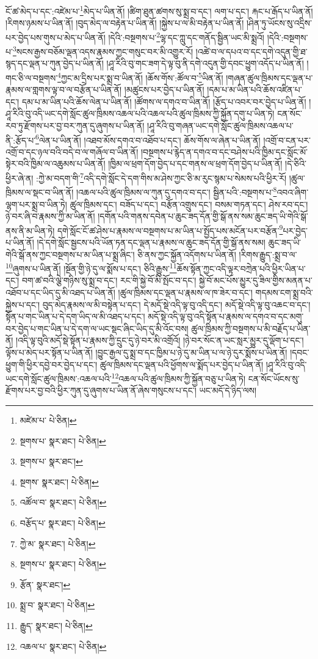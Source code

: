 ངོ་ཚ་མེད་པ་དང་:འཛེམ་པ་\footnote{མཛེམ་པ་  པེ་ཅིན། }མེད་པ་ཡིན་ནོ། །ཚིག་ཐུན་ཚགས་སུ་སྨྲ་བ་དང་། ལག་པ་དང་། རྐང་པ་རྒོད་པ་ཡིན་ནོ། །རིགས་ཉམས་པ་ཡིན་ནོ། །བུད་མེད་ལ་བརྟེན་པ་ཡིན་ནོ། །སྐྱེས་པ་ལ་མི་བརྟེན་པ་ཡིན་ནོ། །ཤིན་ཏུ་ཡོངས་སུ་འདྲིས་པར་བྱེད་པས་གུས་པ་མེད་པ་ཡིན་ནོ། །དེའི་:བསྔགས་པ་\footnote{སྔགས་པ་  སྣར་ཐང་།  པེ་ཅིན། }ལྷ་དང་ཀླུ་དང་གནོད་སྦྱིན་ཡང་མི་སྨྲའོ། །དེའི་:བསྔགས་པ་\footnote{སྔགས་པ་  སྣར་ཐང་། }སངས་རྒྱས་བཅོམ་ལྡན་འདས་རྣམས་ཀྱང་གསུང་བར་མི་འགྱུར་རོ། །འཚེ་བ་ལ་དཔའ་བ་དང་དགེ་འདུན་གྱི་ཐ་སྙད་དང་ལྡན་པ་ཀུན་བྱེད་པ་ཡིན་ནོ། །ཤཱ་རིའི་བུ་གང་ཟག་དེ་ལྟ་བུ་ནི་དགེ་འདུན་གྱི་དབང་ཕྱུག་འདོད་པ་ཡིན་ནོ། །གང་ཅི་ལ་བསྔགས་\footnote{སྔགས་  སྣར་ཐང་།  པེ་ཅིན། }ཀྱང་མ་དྲིས་པར་སྨྲ་བ་ཡིན་ནོ། །ཆོས་གོས་:ཚོལ་བ་\footnote{འཚོལ་བ་  སྣར་ཐང་།  པེ་ཅིན། }ཡིན་ནོ། །གཞན་ཚུལ་ཁྲིམས་དང་ལྡན་པ་རྣམས་ལ་གླགས་ལྟ་བ་ལ་བརྩོན་པ་ཡིན་ནོ། །མཚུངས་པར་བྱེད་པ་ཡིན་ནོ། །དམ་པ་མ་ཡིན་པའི་ཆོས་འཛིན་པ་དང་། དམ་པ་མ་ཡིན་པའི་ཆོས་ལེན་པ་ཡིན་ནོ། །ཚོགས་ལ་དགའ་བ་ཡིན་ནོ། །རྩོད་པ་འབར་བར་བྱེད་པ་ཡིན་ནོ། །ཤཱ་རིའི་བུ་འདི་ཡང་དགེ་སློང་ཚུལ་ཁྲིམས་འཆལ་པའི་འཆལ་པའི་ཚུལ་ཁྲིམས་ཀྱི་སྐྱོན་དགུ་པ་ཡིན་ཏེ། ངན་སོང་རབ་ཏུ་རྫོགས་པར་བྱ་བར་ཀུན་དུ་ཞུགས་པ་ཡིན་ནོ། །ཤཱ་རིའི་བུ་གཞན་ཡང་དགེ་སློང་ཚུལ་ཁྲིམས་འཆལ་པ་ནི་:རྩོད་པ་\footnote{བརྩོད་པ་  སྣར་ཐང་།  པེ་ཅིན། }ལེན་པ་ཡིན་ནོ། །འཐབ་མོས་དགའ་བ་འཐོབ་པ་དང་། ཆོས་གོས་ལ་ཞེན་པ་ཡིན་ནོ། །འགྲོ་བ་ངན་པར་འགྲོ་བ་དང་ཉལ་བའི་བདེ་བ་ལ་གཞོལ་བ་ཡིན་ནོ། །བསྔགས་པ་རྙེད་ན་དགའ་བ་དང་བཤེས་པའི་ཁྱིམ་དང་སློང་མོ་སྟེར་བའི་ཁྱིམ་ལ་འཆུམས་པ་ཡིན་ནོ། །ཁྱིམ་ལ་ཕྲག་དོག་བྱེད་པ་དང་གནས་ལ་ཕྲག་དོག་བྱེད་པ་ཡིན་ནོ། །དེ་ཅིའི་ཕྱིར་ཞེ་ན། :ཀྱེ་མ་བདག་གི་\footnote{ཀྱེ་མ་  སྣར་ཐང་།  པེ་ཅིན། }འདི་དགེ་སློང་དེ་དག་གིས་མ་ཤེས་ཀྱང་ཅི་མ་རུང་སྙམ་པ་སེམས་པའི་ཕྱིར་རོ། །ཚུལ་ཁྲིམས་ལ་སྡང་བ་ཡིན་ནོ། །འཆལ་པའི་ཚུལ་ཁྲིམས་ལ་ཀུན་དུ་དགའ་བ་དང་། སྦྱིན་པའི་:བསྔགས་པ་\footnote{སྔགས་པ་  སྣར་ཐང་།  པེ་ཅིན། }འབའ་ཞིག་ལྷག་པར་སྨྲ་བ་ཡིན་ཏེ། ཚུལ་ཁྲིམས་དང་། བཟོད་པ་དང་། བརྩོན་འགྲུས་དང་། བསམ་གཏན་དང་། ཤེས་རབ་དང་། ཉེ་བར་ཞི་བ་རྣམས་ཀྱི་མ་ཡིན་ནོ། །དགོན་པའི་གནས་དབེན་པ་ཆུང་ཟད་དོན་གྱི་སྒོ་ནས་སམ་ཆུང་ཟད་ཡི་གེའི་སྒོ་ནས་ནི་མ་ཡིན་ཏེ། དགེ་སློང་ངོ་ཚ་ཤེས་པ་རྣམས་ལ་བསྔགས་པ་མ་ཡིན་པ་སྤྱོད་པས་མངོན་པར་བརྩོན་\footnote{རྩོན་  སྣར་ཐང་། }པར་བྱེད་པ་ཡིན་ནོ། །དེ་དགེ་སློང་སྦྱངས་པའི་ཡོན་ཏན་དང་ལྡན་པ་རྣམས་ལ་ཆུང་ཟད་དོན་གྱི་སྒོ་ནས་སམ། ཆུང་ཟད་ཡི་གེའི་སྒོ་ནས་ཀྱང་བསྔགས་པ་མ་ཡིན་པ་སྨྲ་ཞིང་། ཅི་ནས་ཀྱང་སྐྱོན་འདོགས་པ་ཡིན་ནོ། །རིགས་རྒྱུད་:སྨྲ་བ་ལ་\footnote{སྨྲ་བ་  སྣར་ཐང་།  པེ་ཅིན། }ཞུགས་པ་ཡིན་ནོ། །སྔོན་གྱི་ཉེ་དུ་ལ་སྨོས་པ་དང་། ཅིའི་རྒྱུས་\footnote{རྒྱུད་  སྣར་ཐང་།  པེ་ཅིན། }ཆོས་སྟོན་ཀྱང་འདི་ལྟར་བཀྲེན་པའི་ཕྱིར་ཡིན་པ་དང་། བག་ཚ་བའི་ལྕེ་གཉིས་སུ་སྨྲ་བ་དང་། རང་གི་སྐྱེ་བོ་མི་སྤོང་བ་དང་། སྐྱེ་བོ་མང་པོས་མྱུར་དུ་ཟིལ་གྱིས་མནན་པ་འཐོབ་པ་དང་ཡིད་དུ་མི་འཐད་པ་ཡིན་ནོ། །ཚུལ་ཁྲིམས་དང་ལྡན་པ་རྣམས་ལ་ཁ་ཟེར་བ་དང་། གདམས་ངག་སྨྲ་བའི་སྐྱེས་པ་དང་། བུད་མེད་རྣམས་ལ་མི་བསྟེན་པ་དང་། དེ་མདོ་སྡེ་འདི་ལྟ་བུ་འདི་དང་། མདོ་སྡེ་འདི་ལྟ་བུ་འཆང་བ་དང་། སྟོན་པ་གང་ཡིན་པ་དེ་དག་ཡིད་ལ་མི་འཐད་པ་དང་། མདོ་སྡེ་འདི་ལྟ་བུ་འདི་སྟོན་པ་རྣམས་ལ་དགའ་བ་དང་མགུ་བར་བྱེད་པ་གང་ཡིན་པ་དེ་དག་ལ་ཡང་སྡང་ཞིང་ཡིད་དུ་མི་འོང་བས། ཚུལ་ཁྲིམས་ཀྱི་བསྔགས་པ་མི་བརྗོད་པ་ཡིན་ནོ། །འདི་ལྟ་བུའི་མདོ་སྡེ་སྟོན་པ་རྣམས་ཀྱི་དྲུང་དུ་ཉེ་བར་མི་འགྲོའོ། །ཉེ་བར་སོང་ན་ཡང་སླར་མྱུར་དུ་ལྡོག་པ་དང་། ལྟོས་པ་མེད་པར་སྟོན་པ་ཡིན་ནོ། །བྱུང་རྒྱལ་དུ་སྨྲ་བ་དང་ཁྱིམ་པ་ཉེ་དུ་མ་ཡིན་པ་ལ་ཉེ་དུར་སྨོས་པ་ཡིན་ནོ། །དབང་ཕྱུག་གི་ཕྱིར་དབྱེ་བར་བྱེད་པ་དང་། ཚུལ་ཁྲིམས་དང་ལྡན་པའི་ཕྱོགས་ལ་སྨོད་པར་བྱེད་པ་ཡིན་ནོ། །ཤཱ་རིའི་བུ་འདི་ཡང་དགེ་སློང་ཚུལ་ཁྲིམས་:འཆལ་པའི་\footnote{འཆལ་པ་  སྣར་ཐང་།  པེ་ཅིན། }འཆལ་པའི་ཚུལ་ཁྲིམས་ཀྱི་སྐྱོན་བཅུ་པ་ཡིན་ཏེ། ངན་སོང་ཡོངས་སུ་རྫོགས་པར་བྱ་བའི་ཕྱིར་ཀུན་དུ་ཞུགས་པ་ཡིན་ནོ་ཞེས་གསུངས་པ་དང་། ཡང་མདོ་དེ་ཉིད་ལས། 